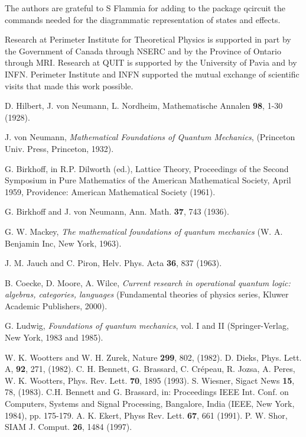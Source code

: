\documentclass[12pt,aps,pra,showpacs,groupedaddress]{revtex4-1}
\begin{document}
\acknowledgments 
The authors are grateful to S Flammia for adding to the package qcircuit the commands needed for the diagrammatic representation of states and effects. 

Research at Perimeter Institute for Theoretical Physics is supported in part by the Government of Canada through NSERC and by the Province of Ontario through MRI.  
Research at QUIT is supported by the University of Pavia and by INFN.  Perimeter Institute and INFN supported the mutual exchange of scientific visits that made this work possible.  



\begin{thebibliography}{99}

 D. Hilbert, J. von Neumann, L. Nordheim, Mathematische
  Annalen {\bf 98}, 1-30 (1928).

 J. von Neumann, {\em Mathematical Foundations of
    Quantum Mechanics}, (Princeton Univ. Press, Princeton, 1932).

 G. Birkhoff,  in R.P. Dilworth (ed.), Lattice Theory, Proceedings of the Second
  Symposium in Pure Mathematics of the American Mathematical Society, April 1959, Providence:
  American Mathematical Society (1961). 


 G. Birkhoff and J. von Neumann, Ann. Math. {\bf  37}, 743 (1936).

 G. W. Mackey, \emph{The mathematical foundations of
  quantum mechanics} (W. A. Benjamin Inc, New York, 1963).

 J. M. Jauch and C. Piron, Helv. Phys. Acta {\bf   36}, 837 (1963).

 B. Coecke, D. Moore, A. Wilce, \emph{Current research
    in operational quantum logic: algebras, categories, languages }
  (Fundamental theories of physics series, Kluwer Academic Publishers,
  2000).

 G. Ludwig, \emph{Foundations of quantum mechanics},
vol. I and II (Springer-Verlag, New York, 1983 and 1985).

  W. K. Wootters and W. H. Zurek,  Nature {\bf 299}, 802, (1982). 
 D. Dieks, Phys. Lett. A, {\bf 92}, 271,  (1982).  
 C. H. Bennett, G. Brassard, C. Cr\'epeau, R. Jozsa, A. Peres, W. K. Wootters, Phys.
  Rev. Lett. {\bf 70}, 1895 (1993).
 S. Wiesner, Sigact News {\bf 15}, 78, (1983).
 C.H. Bennett and G. Brassard, in: Proceedings IEEE Int. Conf. on Computers, Systems
  and Signal Processing, Bangalore, India (IEEE, New York, 1984), pp. 175-179.
   A. K. Ekert, Physs Rev.  Lett. {\bf 67},  661 (1991).
 P. W.  Shor, SIAM J. Comput. { \bf 26}, 1484 (1997).


\end{thebibliography}
\end{document}
